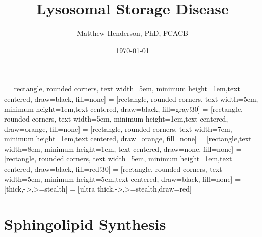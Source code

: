 \documentclass{scrartcl}
\author{Matthew Henderson, PhD, FCACB}
\date{\today}
\title{Lysosomal Storage Disease}
\begin{document}
\maketitle
\tableofcontents


 = [rectangle, rounded corners, text width=5em, minimum height=1em,text centered, draw=black, fill=none]
 = [rectangle, rounded corners, text width=5em, minimum height=1em,text centered, draw=black, fill=gray!30]
 = [rectangle, rounded corners, text width=5em, minimum height=1em,text centered, draw=orange, fill=none]
 = [rectangle, rounded corners, text width=7em, minimum height=1em,text centered, draw=orange, fill=none]
 = [rectangle,text width=8em, minimum height=1em, text centered, draw=none, fill=none]
 = [rectangle, rounded corners, text width=5em, minimum height=1em,text centered, draw=black, fill=red!30]
 = [rectangle, rounded corners, text width=5em, minimum height=5em,text centered, draw=black, fill=none]
 = [thick,->,>=stealth]
 = [ultra thick,->,>=stealth,draw=red]


\section{Sphingolipid Synthesis}
\label{sec:org343b936}
\end{document}
